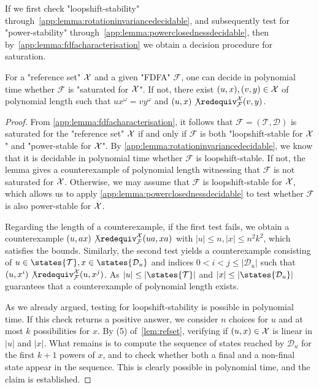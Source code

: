 \documentclass[a4paper,USenglish,cleveref,autoref,thm-restate]{lipics-v2021}
\newcommand{\mc}[1]{\ensuremath{\mathcal{#1}}}
\newcommand{\T}{\mc{T}}
\newcommand{\F}{\mc{F}}
\newcommand{\D}{\mc{D}}
\begin{document}
{If we first check "loopshift-stability" through~\cref{app:lemma:rotationinvariancedecidable}, and subsequently test for "power-stability" through~\cref{app:lemma:powerclosednessdecidable}, then by~\cref{app:lemma:fdfacharacterisation} we obtain a decision procedure for saturation.
\begin{theorem}
    For a "reference set" $\mathcal{X}$ and a given "FDFA" $\F$, one can decide in polynomial time whether $\F$ is "saturated for $\mathcal{X}$".
    If not, there exist $(u,x),(v,y) \in \mathcal{X}$ of polynomial length such that $ux^\omega = vy^\omega$ and $(u,x) \not\redequiv^\X_\F (v,y)$.
  \label{app:theorem:ptimesaturationFDFA}
\end{theorem}
\begin{proof}
    From \cref{app:lemma:fdfacharacterisation}, it follows that $\F = (\T, \D)$ is saturated for the "reference set" $\mathcal{X}$ if and only if $\F$ is both "loopshift-stable for $\mathcal{X}$" and "power-stable for $\mathcal{X}$".
    By \cref{app:lemma:rotationinvariancedecidable}, we know that it is decidable in polynomial time whether $\F$ is loopshift-stable.
    If not, the lemma gives a counterexample of polynomial length witnessing that $\F$ is not saturated for $\mathcal{X}$.
    Otherwise, we may assume that $\F$ is loopshift-stable for $\mathcal{X}$, which allows us to apply \cref{app:lemma:powerclosednessdecidable} to test whether $\F$ is also power-stable for $\mathcal{X}$.
    
    Regarding the length of a counterexample, if the first test fails, we obtain a counterexample $(u, ax) \not\redequiv^\X_\F (ua,xa)$ with $|u| \leq n, |x| \leq n^2k^2$, which satisfies the bounds.
    Similarly, the second test yields a counterexample consisting of $u \in \states{\T}, x\in\states{\D_u}$ and indices $0 <i < j \leq |\D_u|$ such that $(u,x^i) \not\redequiv^\X_\F (u,x^j)$.
    As $|u| \leq |\states{\T}|$ and $|x| \leq |\states{\D_u}|$ guarantees that a counterexample of polynomial length exists.
    
    As we already argued, testing for loopshift-stability is possible in polynomial time.
    If this check returns a positive answer, we consider $n$ choices for $u$ and at most $k$ possibilities for $x$.
    By (5) of~\cref{lem:refset}, verifying if $(u,x) \in \mathcal{X}$ is linear in $|u|$ and $|x|$.
    What remains is to compute the sequence of states reached by $\D_u$ for the first $k + 1$ powers of $x$, and to check whether both a final and a non-final state appear in the sequence.
    This is clearly possible in polynomial time, and the claim is established.
\end{proof}

}
\end{document}
